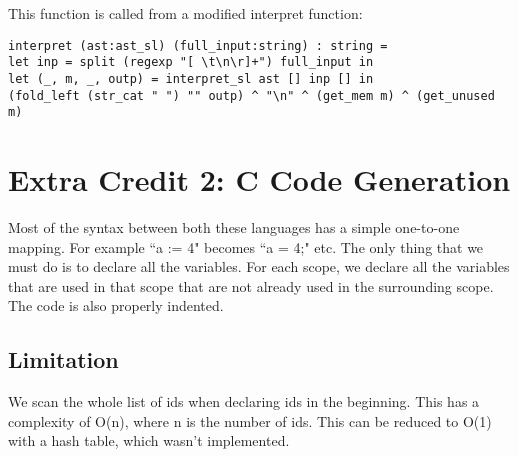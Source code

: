 \documentclass[12pt, letterpaper, twoside]{article}
\begin{document}
This function is called from a modified interpret function:

\begin{lstlisting}
interpret (ast:ast_sl) (full_input:string) : string =                                                                                                                                                                                                                                                                     
let inp = split (regexp "[ \t\n\r]+") full_input in                                                                                                                                                                                                                                                                         
let (_, m, _, outp) = interpret_sl ast [] inp [] in                                                                                                                                                                                                                                                                         
(fold_left (str_cat " ") "" outp) ^ "\n" ^ (get_mem m) ^ (get_unused m)   
\end{lstlisting}

\section {Extra Credit 2: C Code Generation}
Most of the syntax between both these languages has a simple one-to-one mapping. For example ``a := 4" becomes ``a = 4;" etc. The only thing that we must do is to declare all the variables. For each scope, we declare all the variables that are used in that scope that are not already used in the surrounding scope. The code is also properly indented. 
\subsection {Limitation}
We scan the whole list of ids when declaring ids in the beginning. This has a complexity of O(n), where n is the number of ids. This can be reduced to O(1) with a hash table, which wasn't implemented. 
\end{document}
